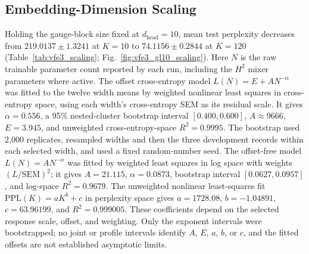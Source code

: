 \documentclass[twoside,11pt]{article}
\begin{document}
\begin{table}[h]
\caption{Configuration shared by the 36 audited sweep records. The archived configurations and corresponding committed code reconstruct the stated two-channel route. Every provenance record has \texttt{git\_dirty=true}, however, and no dirty diff survives, so the recorded source SHAs do not prove the exact executed bytes. The stored custom-optimizer values $\texttt{m\_gauge\_update\_rule=heavy\_ball}$ and $\texttt{m\_gauge\_momentum}=0.9$ are inert because the optional outer frame optimizer is off; $\texttt{phi\_precond\_mode=pullback\_per\_block}$ is also inactive in the retained sweep because both the optional in-E-step frame update and optional outer frame optimizer are off. At each recorded SHA, the committed optimizer gate combined with the stored configuration routes the frame table to ordinary AdamW through the outer cross-entropy graph, but dirty provenance prevents independent reconstruction of the executed optimizer implementation. The mixer adds $H^2$ trainable parameters at $K\geq20$.}
\label{tab:glk_hyperparams}
\end{table}

\subsection{Embedding-Dimension Scaling}
\label{app:vfe3_scaling}
Holding the gauge-block size fixed at $d_{\text{head}}=10$, mean test perplexity decreases from $219.0137 \pm 1.3241$ at $K=10$ to $74.1156 \pm 0.2844$ at $K=120$ (Table~\ref{tab:vfe3_scaling}; Fig.~\ref{fig:vfe3_gl10_scaling}). Here $N$ is the raw trainable parameter count reported by each run, including the $H^2$ mixer parameters where active. The offset cross-entropy model $L(N)=E+AN^{-\alpha}$ was fitted to the twelve width means by weighted nonlinear least squares in cross-entropy space, using each width's cross-entropy SEM as its residual scale. It gives $\alpha=0.556$, a 95\% nested-cluster bootstrap interval $[0.400,0.600]$, $A\approx9666$, $E=3.945$, and unweighted cross-entropy-space $R^2=0.9995$. The bootstrap used 2{,}000 replicates, resampled widths and then the three development records within each selected width, and used a fixed random-number seed. The offset-free model $L(N)=AN^{-\alpha}$ was fitted by weighted least squares in log space with weights $(L/\mathrm{SEM})^2$; it gives $A=21.115$, $\alpha=0.0873$, bootstrap interval $[0.0627,0.0957]$, and log-space $R^2=0.9679$. The unweighted nonlinear least-squares fit $\mathrm{PPL}(K)=aK^b+c$ in perplexity space gives $a=1728.08$, $b=-1.04891$, $c=63.96199$, and $R^2=0.999005$. These coefficients depend on the selected response scale, offset, and weighting. Only the exponent intervals were bootstrapped; no joint or profile intervals identify $A$, $E$, $a$, $b$, or $c$, and the fitted offsets are not established asymptotic limits.
\end{document}
